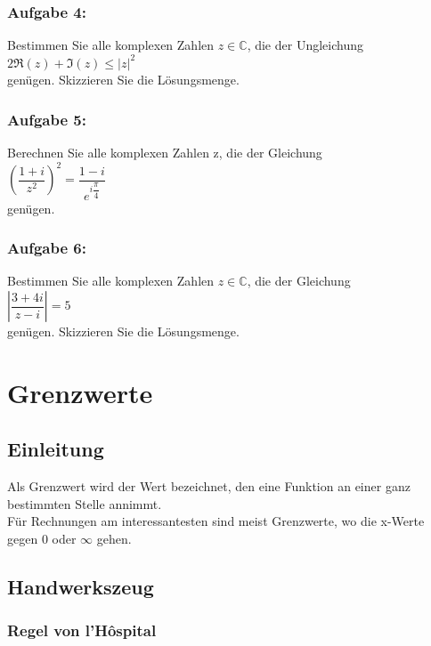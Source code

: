 \documentclass[11pt,final]{scrreprt}
\newcommand{\C} {\mathbb C}
\begin{document}
\subsection*{Aufgabe 4:}
Bestimmen Sie alle komplexen Zahlen $ z \in\C$, die der Ungleichung\\
\hspace*{3em}$2\Re(z) + \Im(z)\leq |z|^2$\\
genügen. Skizzieren Sie die Lösungsmenge.
\subsection*{Aufgabe 5:}
Berechnen Sie alle komplexen Zahlen z, die der Gleichung\\
\hspace*{3em}$ \left( \dfrac{1+i}{z^2} \right)^2 = \dfrac{1-i}{e^{i\dfrac{\pi}{4}}}$\\
genügen.
\subsection*{Aufgabe 6:}
Bestimmen Sie alle komplexen Zahlen $ z \in\C$, die der Gleichung\\
\hspace*{3em}$\left| \dfrac{3+4i}{z-i} \right| = 5$\\
genügen. Skizzieren Sie die Lösungsmenge.

\chapter{Grenzwerte}

\section{Einleitung}

Als Grenzwert wird der Wert bezeichnet, den eine Funktion an einer ganz bestimmten Stelle annimmt.\\
Für Rechnungen am interessantesten sind meist Grenzwerte, wo die x-Werte gegen 0 oder $\infty$ gehen.\\

\section{Handwerkszeug}

\subsection*{Regel von l'Hôspital}
\end{document}
